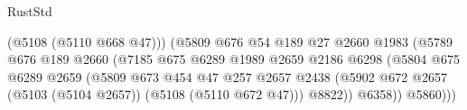 \begin{lexlean}{RustStd}
\begin{coremodule}
                                                          (@5108 (@5110 @668 @47)))
                                                        (@5809
                                                          @676
                                                          @54
                                                          @189
                                                          @27
                                                          @2660
                                                          @1983
                                                          (@5789
                                                            @676
                                                            @189
                                                            @2660
                                                            (@7185
                                                              @675
                                                              @6289
                                                              @1989
                                                              @2659
                                                              @2186
                                                              @6298
                                                              (@5804
                                                                @675
                                                                @6289
                                                                @2659
                                                                (@5809
                                                                  @673
                                                                  @454
                                                                  @47
                                                                  @257
                                                                  @2657
                                                                  @2438
                                                                  (@5902
                                                                    @672
                                                                    @2657
                                                                    (@5103 (@5104 @2657))
                                                                    (@5108 (@5110 @672 @47)))
                                                                  @8822))
                                                              @6358))
                                                          @5860)))

\end{coremodule}
\end{lexlean}
